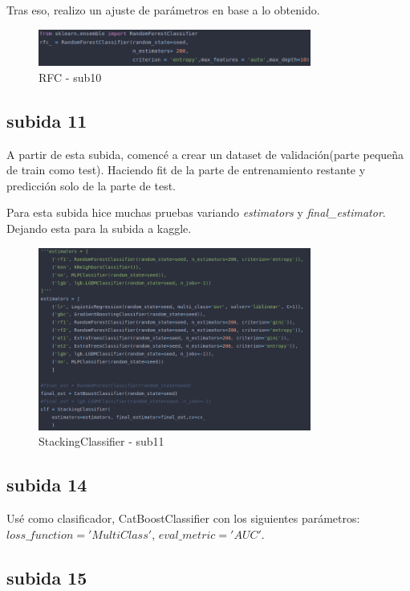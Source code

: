 Tras eso, realizo un ajuste de parámetros en base a lo obtenido.

\begin{figure}[H]
\centering
\includegraphics[width=0.8\textwidth]{imagenes/sub10-rfc.png}
\caption{RFC - sub10}
\end{figure}

\subsection{subida 11}

A partir de esta subida, comencé a crear un dataset de validación(parte pequeña de train como test). Haciendo fit de la parte de entrenamiento restante y predicción solo de la parte de test.

Para esta subida hice muchas pruebas variando \textit{estimators} y \textit{final\_estimator}. Dejando esta para la subida a kaggle.

\begin{figure}[H]
\centering
\includegraphics[width=0.8\textwidth]{imagenes/sub11.png}
\caption{StackingClassifier - sub11}
\end{figure}

\subsection{subida 14}

Usé como clasificador, CatBoostClassifier con los siguientes parámetros: $loss\_function='MultiClass'$, $eval\_metric='AUC'$.

\subsection{subida 15}

